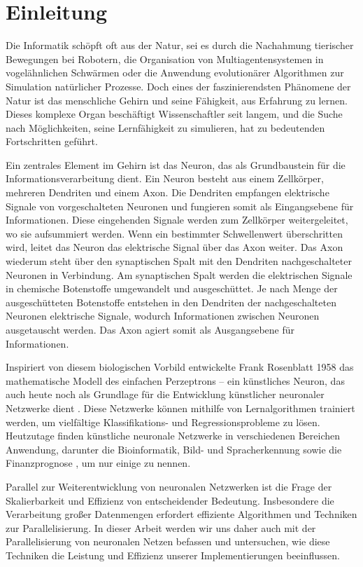 \chapter{Einleitung}
\label{ch:Einleitung}

Die Informatik schöpft oft aus der Natur, sei es durch die Nachahmung tierischer Bewegungen bei Robotern, die Organisation von Multiagentensystemen in vogelähnlichen Schwärmen oder die Anwendung evolutionärer Algorithmen zur Simulation natürlicher Prozesse. Doch eines der faszinierendsten Phänomene der Natur ist das menschliche Gehirn und seine Fähigkeit, aus Erfahrung zu lernen. Dieses komplexe Organ beschäftigt Wissenschaftler seit langem, und die Suche nach Möglichkeiten, seine Lernfähigkeit zu simulieren, hat zu bedeutenden Fortschritten geführt.

Ein zentrales Element im Gehirn ist das Neuron, das als Grundbaustein für die Informationsverarbeitung dient. Ein Neuron besteht aus einem Zellkörper, mehreren Dendriten und einem Axon. Die Dendriten empfangen elektrische Signale von vorgeschalteten Neuronen und fungieren somit als Eingangsebene für Informationen. Diese eingehenden Signale werden zum Zellkörper weitergeleitet, wo sie aufsummiert werden. Wenn ein bestimmter Schwellenwert überschritten wird, leitet das Neuron das elektrische Signal über das Axon weiter. Das Axon wiederum steht über den synaptischen Spalt mit den Dendriten nachgeschalteter Neuronen in Verbindung. Am synaptischen Spalt werden die elektrischen Signale in chemische Botenstoffe umgewandelt und ausgeschüttet. Je nach Menge der ausgeschütteten Botenstoffe entstehen in den Dendriten der nachgeschalteten Neuronen elektrische Signale, wodurch Informationen zwischen Neuronen ausgetauscht werden. Das Axon agiert somit als Ausgangsebene für Informationen.

Inspiriert von diesem biologischen Vorbild entwickelte Frank Rosenblatt 1958 das mathematische Modell des einfachen Perzeptrons – ein künstliches Neuron, das auch heute noch als Grundlage für die Entwicklung künstlicher neuronaler Netzwerke dient . Diese Netzwerke können mithilfe von Lernalgorithmen trainiert werden, um vielfältige Klassifikations- und Regressionsprobleme zu lösen. Heutzutage finden künstliche neuronale Netzwerke in verschiedenen Bereichen Anwendung, darunter die Bioinformatik, Bild- und Spracherkennung sowie die Finanzprognose , um nur einige zu nennen.

Parallel zur Weiterentwicklung von neuronalen Netzwerken ist die Frage der Skalierbarkeit und Effizienz von entscheidender Bedeutung. Insbesondere die Verarbeitung großer Datenmengen erfordert effiziente Algorithmen und Techniken zur Parallelisierung. In dieser Arbeit werden wir uns daher auch mit der Parallelisierung von neuronalen Netzen befassen und untersuchen, wie diese Techniken die Leistung und Effizienz unserer Implementierungen beeinflussen.


